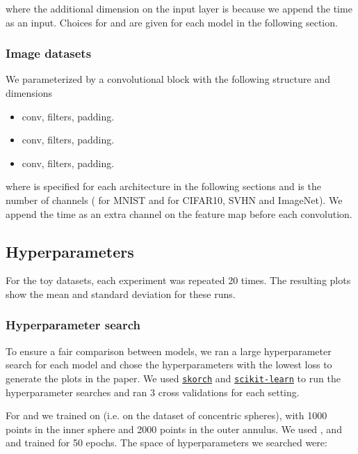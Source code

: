 \documentclass{article}
\begin{document}
where the additional dimension on the input layer is because we append the time  as an input. Choices for  and  are given for each model in the following section.

\subsubsection{Image datasets}

We parameterized  by a convolutional block with the following structure and dimensions

\begin{itemize}
    \item  conv,  filters,  padding.
    \item  conv,  filters,  padding.
    \item  conv,  filters,  padding.
\end{itemize}

where  is specified for each architecture in the following sections and  is the number of channels ( for MNIST and  for CIFAR10, SVHN and ImageNet). We append the time  as an extra channel on the feature map before each convolution.

\subsection{Hyperparameters}

For the toy datasets, each experiment was repeated 20 times. The resulting plots show the mean and standard deviation for these runs.

\subsubsection{Hyperparameter search}

To ensure a fair comparison between models, we ran a large hyperparameter search for each model and chose the hyperparameters with the lowest loss to generate the plots in the paper. We used \href{https://github.com/skorch-dev/skorch}{\texttt{skorch}} and \href{https://scikit-learn.org/stable/}{\texttt{scikit-learn}} \citep{pedregosa2011scikit} to run the hyperparameter searches and ran 3 cross validations for each setting.

For  and  we trained on  (i.e. on the dataset of concentric spheres), with 1000 points in the inner sphere and 2000 points in the outer annulus. We used ,  and  and trained for 50 epochs. The space of hyperparameters we searched were:
\end{document}
